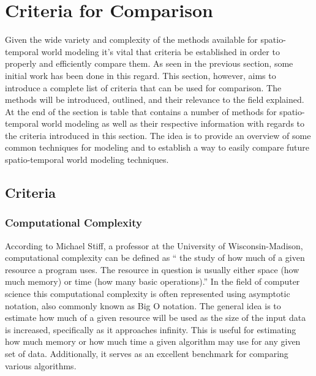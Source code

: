 
  \chapter{Criteria for Comparison}

  Given the wide variety and complexity of the methods available for
  spatio-temporal world modeling it's vital that criteria be established in
  order to properly and efficiently compare them. As seen in the previous
  section, some initial work has been done in this regard. This section,
  however, aims to introduce a complete list of criteria that can be used
  for comparison. The methods will be introduced, outlined, and their relevance
  to the field explained. At the end of the section is table that contains
  a number of methods for spatio-temporal world modeling as well as their
  respective information with regards to the criteria introduced in this section.
  The idea is to provide an overview of some common techniques for modeling
  and to establish a way to easily compare future spatio-temporal world modeling
  techniques. \\

  \section{ Criteria }

  \subsection{ Computational Complexity }
  According to Michael Stiff, a professor at the University of Wisconsin-Madison,
  computational complexity can be defined as `` the study of how much
  of a given resource a program uses. The resource in question is usually
  either space (how much memory) or time (how many basic operations).''
  \cite{ComplexityUW} In the field of computer science this computational
  complexity is often represented using asymptotic notation, also commonly
  known as Big O notation. The general idea is to estimate how much of a given
  resource will be used as the size of the input data is increased, specifically
  as it approaches infinity. This is useful for estimating how much memory or
  how much time a given algorithm may use for any given set of data.
  Additionally, it serves as an excellent benchmark for comparing various
  algorithms.\\

